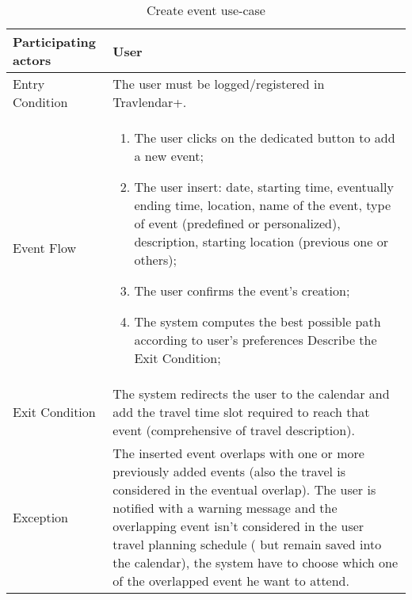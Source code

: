 \begin{table}[H]
	\begin{center}
		\begin{tabular}{ | p{} | p{} | }
		\hline
		Participating actors & User\\
		\hline
		Entry Condition & The user must be logged/registered in Travlendar+.\\
		\hline
		Event Flow & 
			\begin{enumerate}
				\item The user clicks on the dedicated button to add a new event;
				\item The user insert: date, starting time, eventually ending time, location, name of the event, type of event (predefined or personalized), description, starting location (previous one or others);
				\item The user confirms the event’s creation;
				\item The system computes the best possible path according to user’s preferences
Describe the Exit Condition;
			\end{enumerate} \\
		\hline
		Exit Condition & The system redirects the user to the calendar and add the travel time slot required to reach that event (comprehensive of travel description). \\
		\hline
		Exception & The inserted event overlaps with one or more previously added events (also the travel is considered in the eventual overlap). The user is notified with a warning message and the overlapping event isn’t considered in the user travel planning schedule ( but remain saved into the calendar), the system have to choose which one of the overlapped event he want to attend.\\ 
		\hline
		\end{tabular}
	\end{center}
	\caption{Create event use-case}
\end{table}